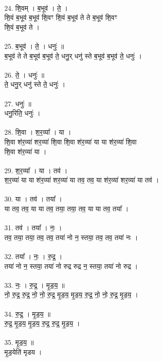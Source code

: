 \\
24. शि॒वम् । ब॒भूव॑ । ते॒ ।\\
शि॒वं ब॒भूव॑ ब॒भूव॑ शि॒वꣳ शि॒वं ब॒भूव॑ ते ते ब॒भूव॑ शि॒वꣳ\\
 शि॒वं ब॒भूव॑ ते ।\\
\\
25. ब॒भूव॑ । ते॒ । धनुः॑ ॥\\
ब॒भूव॑ ते ते ब॒भूव॑ ब॒भूव॑ ते॒ धनु॒र् धनु॑ स्ते ब॒भूव॑ ब॒भूव॑ ते॒ धनुः॑ ।\\
\\
26. ते॒ । धनुः॑ ॥\\
ते॒ धनु॒र् धनु॑ स्ते ते॒ धनुः॑ ।\\
\\
27. धनुः॑ ॥\\
धनु॒रिति॒ धनुः॑ ।\\
\\
28. शि॒वा । श॒र॒व्या᳚ । या ।\\
शि॒वा श॑र॒व्या॑ शर॒व्या॑ शि॒वा शि॒वा श॑र॒व्या॑ या या श॑र॒व्या॑ शि॒वा\\
शि॒वा श॑र॒व्या॑ या ।\\
\\
29. श॒र॒व्या᳚ । या । तव॑ ।\\
श॒र॒व्या॑ या या श॑र॒व्या॑ शर॒व्या॑ या तव॒ तव॒ या श॑र॒व्या॑ शर॒व्या॑ या तव॑ ।\\
\\
30. या । तव॑ । तया᳚ ।\\
या तव॒ तव॒ या या तव॒ तया॒ तया॒ तव॒ या या तव॒ तया᳚ ।\\
\\
31. तव॑ । तया᳚ । नः॒ ।\\
तव॒ तया॒ तया॒ तव॒ तव॒ तया॑ नो न॒ स्तया॒ तव॒ तव॒ तया॑ नः ।\\
\\
32. तया᳚ । नः॒ । रु॒द्र॒ ।\\
तया॑ नो न॒ स्तया॒ तया॑ नो रुद्र रुद्र न॒ स्तया॒ तया॑ नो रुद्र ।\\
\\
33. नः॒ । रु॒द्र॒ । मृ॒ड॒य॒ ॥\\
नो॒ रु॒द्र॒ रु॒द्र॒ नो॒ नो॒ रु॒द्र॒ मृ॒ड॒य॒ मृ॒ड॒य॒ रु॒द्र॒ नो॒ नो॒ रु॒द्र॒ मृ॒ड॒य॒ ।\\
\\
34. रु॒द्र॒ । मृ॒ड॒य॒ ॥\\
रु॒द्र॒ मृ॒ड॒य॒ मृ॒ड॒य॒ रु॒द्र॒ रु॒द्र॒ मृ॒ड॒य॒ ।\\
\\
35. मृ॒ड॒य॒ ॥\\
मृ॒ड॒येति॑ मृडय ।\\
\\
